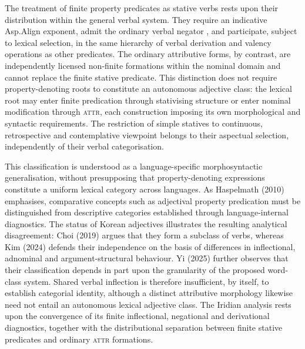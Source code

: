 The treatment of finite property predicates as stative verbs rests upon their
distribution within the general verbal system. They require an indicative
Asp.Align exponent, admit the ordinary verbal negator , and
participate, subject to lexical selection, in the same hierarchy of verbal
derivation and valency operations as other predicates. The ordinary attributive
forms, by contrast, are independently licensed non-finite formations within the
nominal domain and cannot replace the finite stative predicate. This distinction
does not require property-denoting roots to constitute an autonomous adjective
class: the lexical root may enter finite predication through stativising
structure or enter nominal modification through \textsc{attr}, each construction
imposing its own morphological and syntactic requirements. The restriction of
simple statives to continuous, retrospective and contemplative viewpoint belongs
to their aspectual selection, independently of their verbal categorisation.

This classification is understood as a language-specific morphosyntactic
generalisation, without presupposing that property-denoting expressions
constitute a uniform lexical category across languages. As Haspelmath (2010)
\cite[§§2, 5.1]{haspelmath2010} emphasises, comparative concepts such as
adjectival property predication must be distinguished from descriptive
categories established through language-internal diagnostics. The status of
Korean adjectives illustrates the resulting analytical disagreement: Choi (2019)
\cite{choiyoungsik2019} argues that they form a subclass of verbs, whereas
Kim (2024) \cite{kimaeryung2024} defends their independence on the basis of
differences in inflectional, adnominal and argument-structural behaviour.
Yi (2025) \cite{yi2025wordclass} further observes that their classification
depends in part upon the granularity of the proposed word-class system. Shared
verbal inflection is therefore insufficient, by itself, to establish categorial
identity, although a distinct attributive morphology likewise need not entail an
autonomous lexical adjective class. The Iridian analysis rests upon the
convergence of its finite inflectional, negational and derivational diagnostics,
together with the distributional separation between finite stative predicates
and ordinary \textsc{attr} formations.

